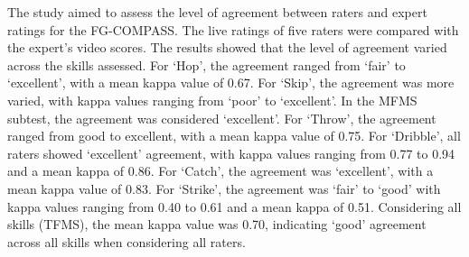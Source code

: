 \documentclass[
  man,
  colorlinks=true,linkcolor=blue,citecolor=blue,urlcolor=blue]{apa7}
\begin{document}
The study aimed to assess the level of agreement between raters and
expert ratings for the FG-COMPASS. The live ratings of five raters were
compared with the expert's video scores. The results showed that the
level of agreement varied across the skills assessed. For `Hop', the
agreement ranged from `fair' to `excellent', with a mean kappa value of
0.67. For `Skip', the agreement was more varied, with kappa values
ranging from `poor' to `excellent'. In the MFMS subtest, the agreement
was considered `excellent'. For `Throw', the agreement ranged from good
to excellent, with a mean kappa value of 0.75. For `Dribble', all raters
showed `excellent' agreement, with kappa values ranging from 0.77 to
0.94 and a mean kappa of 0.86. For `Catch', the agreement was
`excellent', with a mean kappa value of 0.83. For `Strike', the
agreement was `fair' to `good' with kappa values ranging from 0.40 to
0.61 and a mean kappa of 0.51. Considering all skills (TFMS), the mean
kappa value was 0.70, indicating `good' agreement across all skills when
considering all raters.
\end{document}
